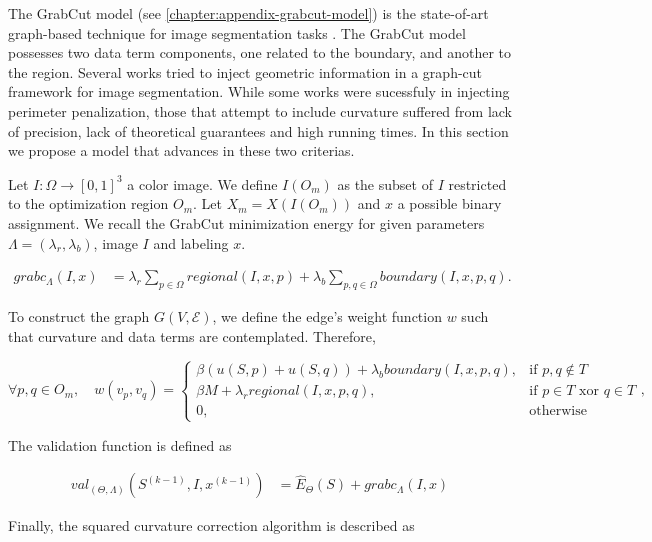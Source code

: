 The GrabCut model (see \ref{chapter:appendix-grabcut-model}) is the state-of-art graph-based technique for image segmentation tasks . The GrabCut model possesses two data term components, one related to the boundary, and another to the region. Several works tried to inject geometric information in a graph-cut framework for image segmentation. While some works were sucessfuly in injecting perimeter penalization, those that attempt to include curvature suffered from lack of precision, lack of theoretical guarantees and high running times. In this section we propose a model that advances in these two criterias.

Let $I:\Omega \rightarrow [0,1]^3$ a color image. We define $I(O_m)$ as the subset of $I$ restricted to the optimization region $O_m$. Let $X_m = X(I(O_m))$ and $x$ a possible binary assignment. We recall the GrabCut minimization energy for given parameters $\Lambda=(\lambda_r, \lambda_b)$, image $I$ and labeling $x$.

\begin{align*}
	grabc_{\Lambda}(I,x) &= \lambda_r \sum_{p \in \Omega}{regional(I,x,p)} + \lambda_b \sum_{p,q \in \Omega}{boundary(I,x,p,q)}.
\end{align*}

To construct the graph $G(V,\mathcal{E})$, we define the edge's weight function $w$ such that curvature and data terms are contemplated. Therefore,  

\[
	\forall p,q \in O_m, \quad w(v_p,v_q) = \left\{ \begin{array}{ll}
		\beta(u(S,p) + u(S,q)) + \lambda_b boundary(I,x,p,q), & \text{if } p,q \notin T	\\
		\beta M + \lambda_r regional(I,x,p,q), & \text{if } p \in T \text{ xor } q \in T \\
		0, & \text{otherwise}
	\end{array},\right.
\]

The validation function is defined as

\begin{align*}
val_{(\Theta,\Lambda)}(S^{(k-1)},I,x^{(k-1)}) &= \hat{E}_{\Theta}(S) + grabc_{\Lambda}(I,x)
\end{align*}

Finally, the squared curvature correction algorithm is described as

